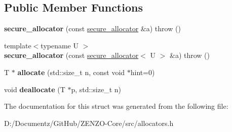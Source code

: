\subsection*{Public Member Functions}
\begin{DoxyCompactItemize}
\item 
\mbox{\label{structsecure__allocator_ae5bfb3589a310e55894bae988d566c44}} 
{\bfseries secure\+\_\+allocator} (const \mbox{\hyperlink{structsecure__allocator}{secure\+\_\+allocator}} \&a)  throw ()
\item 
\mbox{\label{structsecure__allocator_ad7605317012ed2eed2eecb955345d140}} 
{\footnotesize template$<$typename U $>$ }\\{\bfseries secure\+\_\+allocator} (const \mbox{\hyperlink{structsecure__allocator}{secure\+\_\+allocator}}$<$ U $>$ \&a)  throw ()
\item 
\mbox{\label{structsecure__allocator_aee6c375ead3ab5b477898787308bd2d9}} 
T $\ast$ {\bfseries allocate} (std\+::size\+\_\+t n, const void $\ast$hint=0)
\item 
\mbox{\label{structsecure__allocator_af86cc49185bd507b8b479e070d744eb0}} 
void {\bfseries deallocate} (T $\ast$p, std\+::size\+\_\+t n)
\end{DoxyCompactItemize}


The documentation for this struct was generated from the following file\+:\begin{DoxyCompactItemize}
\item 
D\+:/\+Documentz/\+Git\+Hub/\+Z\+E\+N\+Z\+O-\/\+Core/src/allocators.\+h\end{DoxyCompactItemize}
